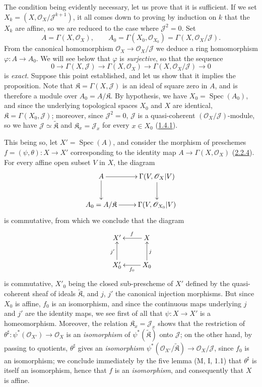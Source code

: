 The condition being evidently necessary, let us prove that it is sufficient.
If we set $X_k=(X,\mathscr{O}_X/\mathscr{J}^{k+1})$, it all comes down to
proving by induction on $k$ that the $X_k$ are affine, so we are reduced to
the case where $\mathscr{J}^2=0$. Set
\[
  A=\Gamma(X,\mathscr{O}_X),\qquad
  A_0=\Gamma(X_0,\mathscr{O}_{X_0})
      =\Gamma(X,\mathscr{O}_X/\mathscr{J}).
\]
From the canonical homomorphism
$\mathscr{O}_X\to\mathscr{O}_X/\mathscr{J}$ we deduce a ring homomorphism
$\varphi:A\to A_0$. We will see below that $\varphi$ is
\emph{surjective}, so that the sequence
\[
  0\to\Gamma(X,\mathscr{J})\to\Gamma(X,\mathscr{O}_X)
  \to\Gamma(X,\mathscr{O}_X/\mathscr{J})\to 0
  \tag{5.1.9.1}\label{I.5.1.9.1}
\]
is \emph{exact}. Suppose this point established, and let us show that it
implies the proposition. Note that $\mathfrak{K}=\Gamma(X,\mathscr{J})$ is an
ideal of square zero in $A$, and is therefore a module over
$A_0=A/\mathfrak{K}$. By hypothesis, we have $X_0=\operatorname{Spec}(A_0)$,
and since the underlying topological spaces $X_0$ and $X$ are identical,
$\mathfrak{K}=\Gamma(X_0,\mathscr{J})$; moreover, since
$\mathscr{J}^2=0$, $\mathscr{J}$ is a quasi-coherent
$(\mathscr{O}_X/\mathscr{J})$-module, so we have
$\mathscr{J}\simeq\widetilde{\mathfrak{K}}$ and
$\mathfrak{K}_x=\mathscr{J}_x$ for every $x\in X_0$
(\hyperref[I.1.4.1]{1.4.1}).

This being so, let $X'=\operatorname{Spec}(A)$, and consider the morphism of
preschemes $f=(\psi,\theta):X\to X'$ corresponding to the identity map
$A\to\Gamma(X,\mathscr{O}_X)$
(\hyperref[I.2.2.4]{2.2.4}). For every affine open subset $V$ in $X$, the
diagram
\[
  \xymatrix{
    A\ar[r]\ar[d] & \Gamma(V,\mathscr{O}_X|V)\ar[d]\\
    A_0=A/\mathfrak{K}\ar[r] & \Gamma(V,\mathscr{O}_{X_0}|V)
  }
\]
is commutative, from which we conclude that the diagram
\[
  \xymatrix{
    X' & X\ar[l]_f\\
    X'_0\ar[u]^{j'} & X_0\ar[l]^{f_0}\ar[u]_j
  }
\]
is commutative, $X'_0$ being the closed sub-prescheme of $X'$ defined by the
quasi-coherent sheaf of ideals $\widetilde{\mathfrak{K}}$, and $j$, $j'$ the
canonical injection morphisms. But since $X_0$ is affine, $f_0$ is an
isomorphism, and since the continuous maps underlying $j$ and $j'$
are the identity maps, we see first of all that
$\psi:X\to X'$ is a homeomorphism. Moreover, the relation
$\mathfrak{K}_x=\mathscr{J}_x$ shows that the restriction of
$\theta^\sharp:\psi^*(\mathscr{O}_{X'})\to\mathscr{O}_X$ is an
\emph{isomorphism} of $\psi^*(\widetilde{\mathfrak{K}})$ onto $\mathscr{J}$;
on the other hand, by passing to quotients, $\theta^\sharp$ gives an
\emph{isomorphism}
$\psi^*(\mathscr{O}_{X'}/\widetilde{\mathfrak{K}})
\to\mathscr{O}_X/\mathscr{J}$, since $f_0$ is an isomorphism; we
conclude immediately by the five lemma (M, I, 1.1) that $\theta^\sharp$ is
itself an isomorphism, hence that $f$ is an \emph{isomorphism}, and
consequently that $X$ is affine.

